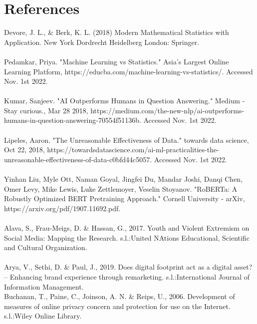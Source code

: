 \documentclass[11pt]{article}
\begin{document}
%
%

\section{References}
Devore, J. L., \& Berk, K. L. (2018) Modern Mathematical Statistics with Application. New York Dordrecht Heidelberg London: Springer.\\ \\

Pedamkar, Priya. "Machine Learning vs Statistics." Asia's Largest Online Learning Platform, https://educba.com/machine-learning-vs-statistics/. Accessed Nov. 1st 2022. 
\\ \\

Kumar, Sanjeev. "AI Outperforms Humans in Question Answering." Medium - Stay curious., Mar 28 2018, https://medium.com/the-new-nlp/ai-outperforms-humans-in-question-answering-70554f51136b. Accessed Nov. 1st 2022.\\ \\

Lipeles, Aaron. "The Unreasonable Effectiveness of Data." towards data science, Oct 22, 2018, https://towardsdatascience.com/ai-ml-practicalities-the-unreasonable-effectiveness-of-data-c0bfd44c5057. Accessed Nov. 1st 2022.\\ \\

Yinhan Liu, Myle Ott, Naman Goyal, Jingfei Du, Mandar Joshi, Danqi Chen, Omer Levy, Mike Lewis, Luke Zettlemoyer, Veselin Stoyanov. "RoBERTa: A Robustly Optimized BERT Pretraining Approach." Cornell University - arXiv, https://arxiv.org/pdf/1907.11692.pdf.\\ \\

Alava, S., Frau-Meigs, D. \& Hassan, G., 2017. Youth and Violent Extremism on Social Media: Mapping the Research. s.l.:United NAtions Educational, Scientific and Cultural Organization.\\ \\

Arya, V., Sethi, D. \& Paul, J., 2019. Does digital footprint act as a digital asset? – Enhancing brand experience through remarketing. s.l.:International Journal of Information Management. \\ 

Buchanan, T., Paine, C., Joinson, A. N. \& Reips, U., 2006. Development of measures of online privacy concern and protection for use on the Internet. s.l.:Wiley Online Library. \\
\end{document}
